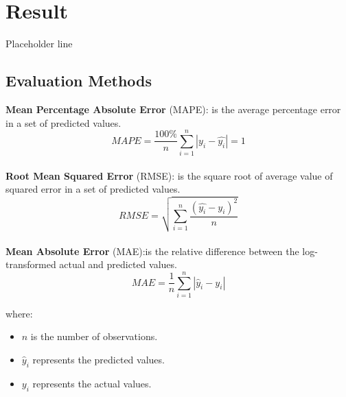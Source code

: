 \documentclass{ieeeojies}
\begin{document}
\section{Result}
Placeholder line
\subsection{Evaluation Methods}
\textbf{Mean Percentage Absolute Error} (MAPE): is the average percentage error in a set of predicted values.\\
\[MAPE=\frac{100\%}{n}  \sum_{i=1}^{n} |y_i-\hat{y_i} |  = 1 \]\\
\textbf{Root Mean Squared Error} (RMSE): is the square root of average value of squared error in a set of predicted values.\\
\[RMSE=\sqrt{\sum_{i=1}^{n} \frac{(\hat{y_i}-y_i )^2}{n} }\]\\
\textbf{Mean Absolute Error} (MAE):is the relative difference between the log-transformed actual and predicted values.\\
\[
MAE = \frac{1}{n} \sum_{i=1}^{n} \left| \hat{y}_i - y_i \right|
\]

where:
\begin{itemize}
    \item \(n\) is the number of observations.
    \item \(\hat{y}_i\) represents the predicted values.
    \item \(y_i\) represents the actual values.
\end{itemize}
\end{document}
